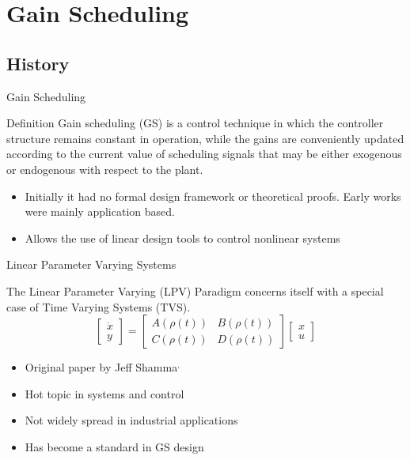 \section{Gain Scheduling}

\subsection{History}
\begin{frame}{Gain Scheduling \autocite{Rugh2000}}
\begin{block}{Definition}
	Gain scheduling (GS) is a control technique in which the controller structure remains constant in operation, while the gains are conveniently updated according to the current value of scheduling signals that may be either exogenous or endogenous with respect to the plant. 
\end{block}

	\begin{itemize}
		\item Initially it had no formal design framework or theoretical proofs. Early works were mainly application based.
		\item Allows the use of linear design tools to control nonlinear systems
	\end{itemize}
\end{frame}


\begin{frame}{Linear Parameter Varying Systems}
\begin{block}{}
The Linear Parameter Varying (LPV) Paradigm concerns itself with a special case of Time Varying Systems (TVS). 
\begin{equation}  \label{eq:gen_LPV}
\begin{bmatrix}
\dot{x}\\
y
\end{bmatrix} = \begin{bmatrix}
A(\rho(t)) & B(\rho(t))\\
C(\rho(t)) & D(\rho(t))
\end{bmatrix}\begin{bmatrix}
x\\
u
\end{bmatrix}
\end{equation}
\end{block}

\begin{itemize}
	\item Original paper by Jeff Shamma\autocite{Shamma1988}$^{,}$\autocite{Shamma1990}
    \item Hot topic in systems and control
 	\item Not widely spread in industrial applications
    \item Has become a standard in GS design
\end{itemize}
\end{frame}

